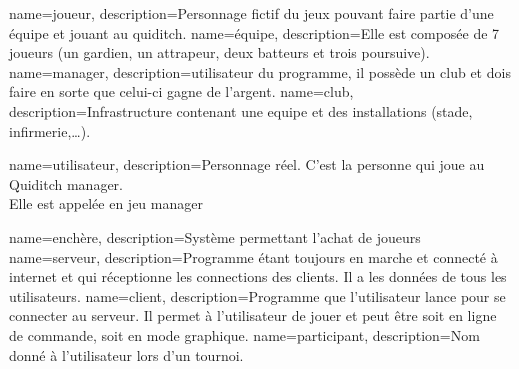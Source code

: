 {
    name=joueur,
    description={Personnage fictif du jeux pouvant faire partie d'une équipe et jouant au quiditch.}
}
{
    name=équipe,
    description={Elle est composée de 7 \glspl{joueur} (un gardien, un attrapeur, deux batteurs et trois poursuive).}
}
{
    name=manager,
    description={\Gls{utilisateur} du programme, il possède un \gls{club} et dois faire en sorte que celui-ci gagne de l'argent.}
}
{
    name=club,
    description={Infrastructure contenant une \gls{equipe} et des installations (stade, infirmerie,\ldots).}
}

{
    name=utilisateur,
    description={Personnage réel. C'est la personne qui joue au Quiditch manager.\\
    Elle est appelée en jeu \gls{manager}}
}

{
    name=enchère,
    description={Système permettant l'achat de joueurs}
}
{
    name=serveur,
    description={Programme étant toujours en marche et connecté à internet et qui réceptionne les connections des \glspl{client}. Il a les données de tous les \glspl{utilisateur}.}
}
{
    name=client,
    description={Programme que l'\gls{utilisateur} lance pour se connecter au \gls{serveur}. Il permet à l'\gls{utilisateur} de jouer et peut être soit en ligne de commande, soit en mode graphique.}
}
{
    name=participant,
    description={Nom donné à l'\gls{utilisateur} lors d'un tournoi.}
}


